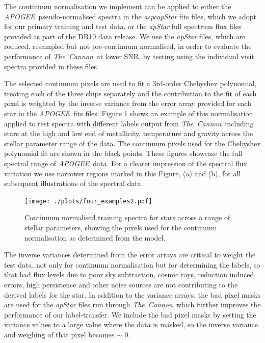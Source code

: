 \documentclass[12pt, preprint]{aastex}
\newcommand{\tc}{\textsl{The~Cannon}}
\newcommand{\apogee}{\textsl{APOGEE}}
\begin{document}
The continuum normalisation we implement can be applied to either the \apogee\ pseudo-normalised spectra in the \textit{aspcapStar} fits files, which we adopt for our primary training and test data, or the \textit{apStar} full spectrum flux files provided as part of the DR10 data release. We use the \textit{apStar} files, which are reduced, resampled but not pre-continuum normalised, in order to evaluate the performance of \tc\ at lower SNR, by testing using the individual visit spectra provided in these files.  

The selected continuum pixels are used to fit a 3rd-order Chebyshev polynomial, treating each of the three chips separately and the contribution to the fit of each pixel is weighted by the inverse variance from the error array provided for each star in the \apogee\ fits files. Figure \ref{fig:norm} shows an example of this normalisation applied to test spectra with different labels output from \tc\, including stars at the high and low end of metallicity, temperature and gravity across the stellar parameter range of the data. The continuum pixels used for the Chebyshev polynomial fit are shown in the black points. These figures showcase the full spectral range of \apogee\ data. For a clearer impression of the spectral flux variation we use narrower regions marked in this Figure, (a) and (b), for all subsequent illustrations of the spectral data. 

\begin{figure}[h!]
  \texttt{[image: ./plots/four\_examples2.pdf]}
\caption{Continuum normalised training spectra for stars across a range of stellar parameters, showing the pixels used for the continuum normalisation as determined from the model.}
\label{fig:norm}
\end{figure}


The inverse variances determined from the error arrays are critical to weight the test data, not only for continuum normalisation but for determining the labels, so that bad flux levels due to poor sky subtraction, cosmic rays, reduction induced errors, high persistence and other noise sources are not contributing to the derived labels for the star. In addition to the variance arrays, the bad pixel masks are used for the \textit{apStar} files run through \tc\, which further improves the performance of our label-transfer. We include the bad pixel masks by setting the variance values to a large value where the data is masked, so the inverse variance and weighing of that pixel becomes $\sim$ 0. 
\end{document}
